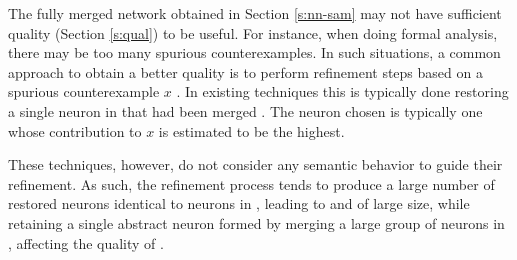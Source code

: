

The fully merged network obtained in Section \ref{s:nn-sam} may not have
sufficient quality (Section \ref{s:qual}) to be useful. For instance, when doing
formal analysis, there may be too many spurious counterexamples. In such
situations, a common approach to obtain a better quality \abs is to perform
refinement steps based on a spurious counterexample $x$ \cite{cegar-nn,
cegarette, cleverest-nn}.  In
existing techniques this is typically done restoring a single neuron in \cnc
that had been merged \abs. The neuron chosen is typically one whose contribution
to $x$ is estimated to be the highest.

These techniques, however, do not consider any semantic behavior to guide their
refinement. As such, the refinement process tends to produce a large number of
restored neurons identical to neurons in \cnc, leading to and \abs of large
size, while retaining a single abstract neuron formed by merging a large group
of neurons in \cnc, affecting the quality of \abs.  
